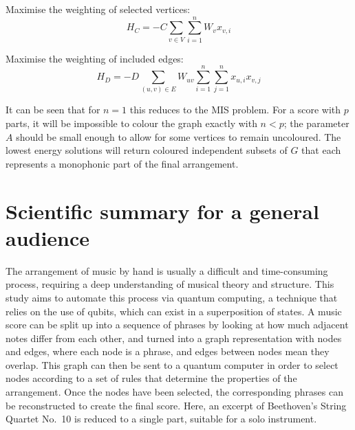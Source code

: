 \documentclass[12pt]{article}
\theoremstyle{definition}
\begin{document}
Maximise the weighting of selected vertices:
\begin{equation*}
    H_C = -C\sum_{v \in V}\sum_{i=1}^n W_vx_{v,i}
\end{equation*}

Maximise the weighting of included edges:
\begin{equation*}
    H_D = -D\sum_{(u,v)\in E}W_{uv}\sum_{i=1}^n\sum_{j=1}^n x_{u,i}x_{v,j}
\end{equation*}

It can be seen that for $n=1$ this reduces to the MIS problem. For a score with $p$ parts, it will be impossible to colour the graph exactly with $n<p$; the parameter $A$ should be small enough to allow for some vertices to remain uncoloured. The lowest energy solutions will return coloured independent subsets of $G$ that each represents a monophonic part of the final arrangement.

\clearpage

\section*{Scientific summary for a general audience} %

The arrangement of music by hand is usually a difficult and time-consuming process, requiring a deep understanding of musical theory and structure. This study aims to automate this process via quantum computing, a technique that relies on the use of qubits, which can exist in a superposition of states. A music score can be split up into a sequence of phrases by looking at how much adjacent notes differ from each other, and turned into a graph representation with nodes and edges, where each node is a phrase, and edges between nodes mean they overlap. This graph can then be sent to a quantum computer in order to select nodes according to a set of rules that determine the properties of the arrangement. Once the nodes have been selected, the corresponding phrases can be reconstructed to create the final score. Here, an excerpt of Beethoven's String Quartet No.\ 10 is reduced to a single part, suitable for a solo instrument.
\end{document}
